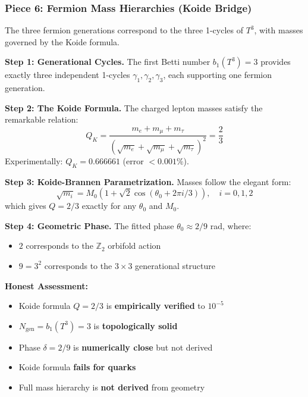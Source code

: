 \documentclass[12pt,a4paper]{article}
\newcommand{\Ztwo}{\mathbb{Z}_2}
\begin{document}
\subsubsection{Piece 6: Fermion Mass Hierarchies (Koide Bridge)}

The three fermion generations correspond to the three 1-cycles of $T^3$, with masses governed by the Koide formula.

\textbf{Step 1: Generational Cycles.}
The first Betti number $b_1(T^3) = 3$ provides exactly three independent 1-cycles $\gamma_1, \gamma_2, \gamma_3$, each supporting one fermion generation.

\textbf{Step 2: The Koide Formula.}
The charged lepton masses satisfy the remarkable relation:
\begin{equation}
Q_K = \frac{m_e + m_\mu + m_\tau}{(\sqrt{m_e} + \sqrt{m_\mu} + \sqrt{m_\tau})^2} = \frac{2}{3}
\end{equation}
Experimentally: $Q_K = 0.666661$ (error $< 0.001\%$).

\textbf{Step 3: Koide-Brannen Parametrization.}
Masses follow the elegant form:
\begin{equation}
\sqrt{m_i} = M_0(1 + \sqrt{2}\cos(\theta_0 + 2\pi i/3)), \quad i = 0,1,2
\end{equation}
which gives $Q = 2/3$ exactly for any $\theta_0$ and $M_0$.

\textbf{Step 4: Geometric Phase.}
The fitted phase $\theta_0 \approx 2/9$ rad, where:
\begin{itemize}[itemsep=0pt]
    \item $2$ corresponds to the $\Ztwo$ orbifold action
    \item $9 = 3^2$ corresponds to the $3 \times 3$ generational structure
\end{itemize}

\textbf{Honest Assessment:}
\begin{itemize}[itemsep=0pt]
    \item[\checkmark] Koide formula $Q = 2/3$ is \textbf{empirically verified} to $10^{-5}$
    \item[\checkmark] $N_{\text{gen}} = b_1(T^3) = 3$ is \textbf{topologically solid}
    \item[$\sim$] Phase $\delta = 2/9$ is \textbf{numerically close} but not derived
    \item[$\times$] Koide formula \textbf{fails for quarks}
    \item[$\times$] Full mass hierarchy is \textbf{not derived} from geometry
\end{itemize}
\end{document}

